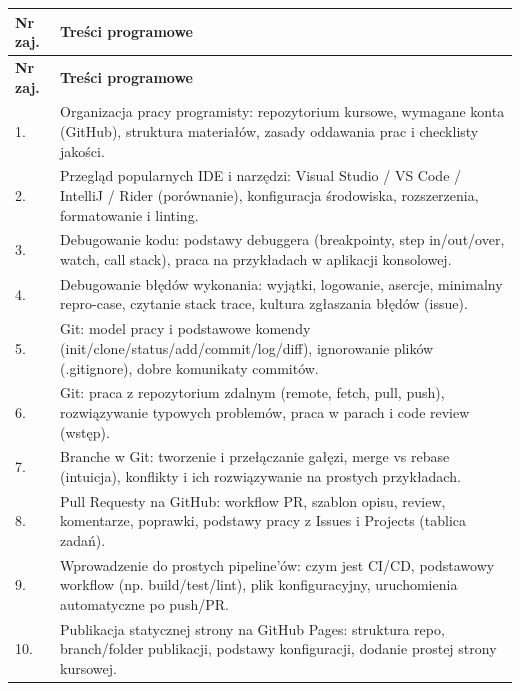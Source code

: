 \documentclass[12pt, a4paper]{article}
\newcommand{\thdrule}{\noalign{\global\setlength{\extrarowheight}{0pt}}}
\newcommand{\thdend}{\noalign{\global\setlength{\extrarowheight}{3pt}}}
\begin{document}
{\scriptsize
\begin{longtable}{m{1.5cm}m{14.5cm}}
\thdrule\toprule
\rowcolor{pjatkRed} {\color{white}\textbf{Nr zaj.}} & {\color{white}\textbf{Treści programowe}} \\
\midrule\thdend
\endfirsthead
\thdrule\toprule
\rowcolor{pjatkRed} {\color{white}\textbf{Nr zaj.}} & {\color{white}\textbf{Treści programowe}} \\
\midrule\thdend
\endhead
  \rowcolor{tableRowLight} 1. & Organizacja pracy programisty: repozytorium kursowe, wymagane konta (GitHub), struktura materiałów, zasady oddawania prac i checklisty jakości. \\
  \rowcolor{tableRowAlt} 2. & Przegląd popularnych IDE i narzędzi: Visual Studio / VS Code / IntelliJ / Rider (porównanie), konfiguracja środowiska, rozszerzenia, formatowanie i linting. \\
  \rowcolor{tableRowLight} 3. & Debugowanie kodu: podstawy debuggera (breakpointy, step in/out/over, watch, call stack), praca na przykładach w aplikacji konsolowej. \\
  \rowcolor{tableRowAlt} 4. & Debugowanie błędów wykonania: wyjątki, logowanie, asercje, minimalny repro-case, czytanie stack trace, kultura zgłaszania błędów (issue). \\
  \rowcolor{tableRowLight} 5. & Git: model pracy i podstawowe komendy (init/clone/status/add/commit/log/diff), ignorowanie plików (.gitignore), dobre komunikaty commitów. \\
  \rowcolor{tableRowAlt} 6. & Git: praca z repozytorium zdalnym (remote, fetch, pull, push), rozwiązywanie typowych problemów, praca w parach i code review (wstęp). \\
  \rowcolor{tableRowLight} 7. & Branche w Git: tworzenie i przełączanie gałęzi, merge vs rebase (intuicja), konflikty i ich rozwiązywanie na prostych przykładach. \\
  \rowcolor{tableRowAlt} 8. & Pull Requesty na GitHub: workflow PR, szablon opisu, review, komentarze, poprawki, podstawy pracy z Issues i Projects (tablica zadań). \\
  \rowcolor{tableRowLight} 9. & Wprowadzenie do prostych pipeline’ów: czym jest CI/CD, podstawowy workflow (np. build/test/lint), plik konfiguracyjny, uruchomienia automatyczne po push/PR. \\
  \rowcolor{tableRowAlt} 10. &  Publikacja statycznej strony na GitHub Pages: struktura repo, branch/folder publikacji, podstawy konfiguracji, dodanie prostej strony kursowej. \\

\end{longtable}}
\end{document}
